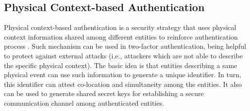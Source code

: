 \documentclass[sigplan]{acmart}
\begin{document}
\subsection{Physical Context-based Authentication}
Physical context-based authentication is a security strategy that uses physical context information shared among different entities to reinforce authentication process \cite{MeloJr.2018}.
Such mechanism can be used in two-factor authentication, being helpful to protect against external attacks (i.e., attackers which are not able to describe the specific physical context).
The basic idea is that entities describing a same physical event can use such information to generate a unique identifier.
In turn, this identifier can attest co-location and simultaneity among the entities.
It also can be used to generate shared secret keys for establishing a secure communication channel among authenticated entities.
\end{document}
